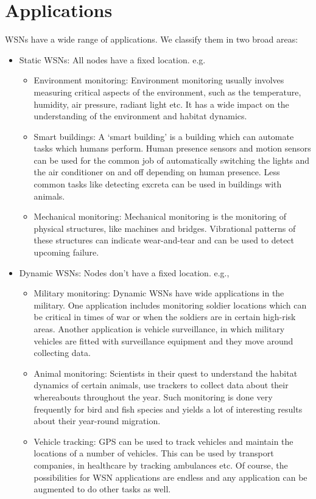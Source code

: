 \documentclass[twocolumn]{article}
\begin{document}
\section{Applications}
WSNs have a wide range of applications. We classify them in two broad areas:
\begin{itemize}
\item Static WSNs: All nodes have a fixed location. e.g.\,
\begin{itemize}
\item Environment monitoring: Environment monitoring usually involves measuring critical aspects of the environment, such as the temperature, humidity, air pressure, radiant light etc. It has a wide impact on the understanding of the environment and habitat dynamics.
\item Smart buildings: A `smart building' is a building which can automate tasks which humans perform. Human presence sensors and motion sensors can be used for the common job of automatically switching the lights and the air conditioner on and off depending on human presence. Less common tasks like detecting excreta can be used in buildings with animals.
\item Mechanical monitoring: Mechanical monitoring is the monitoring of physical structures, like machines and bridges. Vibrational patterns of these structures can indicate wear-and-tear and can be used to detect upcoming failure.
\end{itemize}
\item Dynamic WSNs: Nodes don't have a fixed location. e.g.,\
\begin{itemize}
\item Military monitoring: Dynamic WSNs have wide applications in the military. One application includes monitoring soldier locations which can be critical in times of war or when the soldiers are in certain high-risk areas. Another application is vehicle surveillance, in which military vehicles are fitted with surveillance equipment and they move around collecting data.
\item Animal monitoring: Scientists in their quest to understand the habitat dynamics of certain animals, use trackers to collect data about their whereabouts throughout the year. Such monitoring is done very frequently for bird and fish species and yields a lot of interesting results about their year-round migration.
\item Vehicle tracking: GPS can be used to track vehicles and maintain the locations of a number of vehicles. This can be used by transport companies, in healthcare by tracking ambulances etc.
Of course, the possibilities for WSN applications are endless and any application can be augmented to do other tasks as well.
\end{itemize}
\end{itemize}
\end{document}
